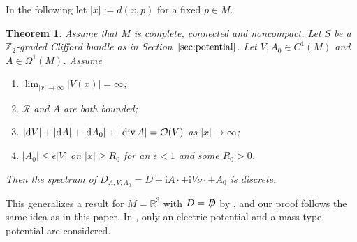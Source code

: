 \documentclass[10pt,a4paper]{amsart}
\numberwithin{equation}{section}
\newtheorem{Theorem}{Theorem}[section]
\begin{document}
In the following let $|x|:= d(x,p)$ for a fixed $p\in M$.

\begin{Theorem}\label{thm_pot} Assume that $M$ is complete, connected and noncompact. Let $S$ be a $\mathbb Z_2$-graded Clifford bundle as in Section~$\ref{sec:potential}$. Let $V, A_0\in C^1(M)$ and $A\in \Omega^1(M)$.
Assume
\begin{enumerate}[$(i)$]\itemsep=0pt
		\item $\lim_{|x|\to \infty} |{V}(x)|=\infty$;
		\item $\mathcal{R}$ and $A$ are both bounded;
		\item $|{\rm d}V| + |{\rm d}A| + |{\rm d}A_0|+ |\operatorname{div} A|= \mathcal{O}(V)$ as $|x|\to \infty$;
		\item $|A_0|\leq \epsilon |V|$ on $|x|\geq R_0$ for an $\epsilon <1$ and some $R_0>0$.
\end{enumerate}
Then the spectrum of $D_{A,V, A_0}= D +{\mathrm{i}}A\cdot + {\mathrm{i}}V\nu \cdot +A_0$ is discrete.
\end{Theorem}

This generalizes a result for $M={\mathbb R}^3$ with $D={\slashed{D}}$ by \cite{Yamada}, and our proof follows the same idea as in this paper. In \cite{Yamada}, only an electric potential and a mass-type potential are considered.
\end{document}
